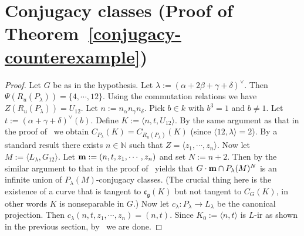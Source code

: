 \section{Conjugacy classes (Proof of Theorem~\ref{conjugacy-counterexample})}

\begin{proof}
Let $G$ be as in the hypothesis. Let $\lambda:=(\alpha+2\beta+\gamma+\delta)^{\vee}$. Then $\Psi(R_u(P_\lambda))=\{4,\cdots, 12\}$. Using the commutation relations we have $Z(R_u(P_\lambda))=U_{12}$. Let $n:=n_\alpha n_\gamma n_\delta$. Pick $b\in k$ with $b^3=1$ and $b\neq 1$. Let $t:=(\alpha+\gamma+\delta)^{\vee}(b)$. Define $K:=\langle n, t, U_{12} \rangle$. 
By the same argument as that in the proof of~\cite[Lem.~5.1]{Uchiyama-Separability-JAlgebra} we obtain $C_{P_\lambda}(K)=C_{R_u(P_\lambda)}(K)$ (since $\langle 12, \lambda\rangle=2$). By a standard result there exists $n\in \mathbb{N}$ such that $Z=\langle z_1,\cdots, z_n \rangle$. Now let $M:=\langle L_\lambda, G_{12} \rangle$. Let ${\bf m}:=(n, t, z_1,\cdots, z_n)$ and set $N:=n+2$. Then by the similar argument to that in the proof of~\cite[Lem.~5.1]{Uchiyama-Separability-JAlgebra} yields that $G\cdot {\bf m}\cap P_\lambda(M)^N$ is an infinite union of $P_\lambda(M)$-conjugacy classes. (The crucial thing here is the existence of a curve that is tangent to $\mathfrak{c}_{\mathfrak{g}}(K)$ but not tangent to $C_G(K)$, in other words $K$ is nonseparable in $G$.) Now let $c_\lambda:P_\lambda\rightarrow L_\lambda$ be the canonical projection. Then $c_\lambda(n, t, z_1, \cdots, z_n)=(n,t)$. Since $K_0:=\langle n, t \rangle$ is $L$-ir as shown in the previous section, by~\cite[Prop.~3.5.2]{Stewart-thesis} we are done. 
\end{proof}

